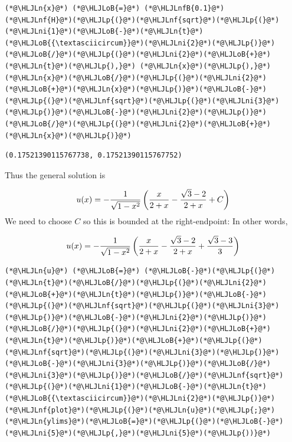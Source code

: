 \documentclass[12pt,a4paper]{article}
\newcommand{\HLJLn}[1]{#1}
\newcommand{\HLJLnf}[1]{\textcolor[RGB]{66,102,213}{#1}}
\newcommand{\HLJLnfB}[1]{\textcolor[RGB]{59,151,46}{#1}}
\newcommand{\HLJLni}[1]{\textcolor[RGB]{59,151,46}{#1}}
\newcommand{\HLJLoB}[1]{\textcolor[RGB]{102,102,102}{\textbf{#1}}}
\newcommand{\HLJLp}[1]{#1}
\begin{document}
\begin{lstlisting}
(*@\HLJLn{x}@*) (*@\HLJLoB{=}@*) (*@\HLJLnfB{0.1}@*)
(*@\HLJLnf{H}@*)(*@\HLJLp{(}@*)(*@\HLJLnf{sqrt}@*)(*@\HLJLp{(}@*)(*@\HLJLni{1}@*)(*@\HLJLoB{-}@*)(*@\HLJLn{t}@*)(*@\HLJLoB{{\textasciicircum}}@*)(*@\HLJLni{2}@*)(*@\HLJLp{)}@*)(*@\HLJLoB{/}@*)(*@\HLJLp{(}@*)(*@\HLJLni{2}@*)(*@\HLJLoB{+}@*)(*@\HLJLn{t}@*)(*@\HLJLp{),}@*) (*@\HLJLn{x}@*)(*@\HLJLp{),}@*) (*@\HLJLn{x}@*)(*@\HLJLoB{/}@*)(*@\HLJLp{(}@*)(*@\HLJLni{2}@*)(*@\HLJLoB{+}@*)(*@\HLJLn{x}@*)(*@\HLJLp{)}@*)(*@\HLJLoB{-}@*)(*@\HLJLp{(}@*)(*@\HLJLnf{sqrt}@*)(*@\HLJLp{(}@*)(*@\HLJLni{3}@*)(*@\HLJLp{)}@*)(*@\HLJLoB{-}@*)(*@\HLJLni{2}@*)(*@\HLJLp{)}@*)(*@\HLJLoB{/}@*)(*@\HLJLp{(}@*)(*@\HLJLni{2}@*)(*@\HLJLoB{+}@*)(*@\HLJLn{x}@*)(*@\HLJLp{)}@*)
\end{lstlisting}

\begin{lstlisting}
(0.17521390115767738, 0.17521390115767752)
\end{lstlisting}


Thus the general solution is

\[
u(x) = -{1 \over \sqrt{1-x^2}} \left( {x\over 2+x} -{ \sqrt{3} -2 \over 2+x} + C \right)
\]
We need to choose $C$ so this is bounded at the right-endpoint: In other words, 

\[
u(x) = -{1 \over \sqrt{1-x^2}} \left( {x\over 2+x} -{ \sqrt{3} -2 \over 2+x} +{ \sqrt{3} -3 \over 3}  \right)
\]

\begin{lstlisting}
(*@\HLJLn{u}@*) (*@\HLJLoB{=}@*) (*@\HLJLoB{-}@*)(*@\HLJLp{(}@*)(*@\HLJLn{t}@*)(*@\HLJLoB{/}@*)(*@\HLJLp{(}@*)(*@\HLJLni{2}@*)(*@\HLJLoB{+}@*)(*@\HLJLn{t}@*)(*@\HLJLp{)}@*)(*@\HLJLoB{-}@*)(*@\HLJLp{(}@*)(*@\HLJLnf{sqrt}@*)(*@\HLJLp{(}@*)(*@\HLJLni{3}@*)(*@\HLJLp{)}@*)(*@\HLJLoB{-}@*)(*@\HLJLni{2}@*)(*@\HLJLp{)}@*)(*@\HLJLoB{/}@*)(*@\HLJLp{(}@*)(*@\HLJLni{2}@*)(*@\HLJLoB{+}@*)(*@\HLJLn{t}@*)(*@\HLJLp{)}@*)(*@\HLJLoB{+}@*)(*@\HLJLp{(}@*)(*@\HLJLnf{sqrt}@*)(*@\HLJLp{(}@*)(*@\HLJLni{3}@*)(*@\HLJLp{)}@*)(*@\HLJLoB{-}@*)(*@\HLJLni{3}@*)(*@\HLJLp{)}@*)(*@\HLJLoB{/}@*)(*@\HLJLni{3}@*)(*@\HLJLp{)}@*)(*@\HLJLoB{/}@*)(*@\HLJLnf{sqrt}@*)(*@\HLJLp{(}@*)(*@\HLJLni{1}@*)(*@\HLJLoB{-}@*)(*@\HLJLn{t}@*)(*@\HLJLoB{{\textasciicircum}}@*)(*@\HLJLni{2}@*)(*@\HLJLp{)}@*)
(*@\HLJLnf{plot}@*)(*@\HLJLp{(}@*)(*@\HLJLn{u}@*)(*@\HLJLp{;}@*) (*@\HLJLn{ylims}@*)(*@\HLJLoB{=}@*)(*@\HLJLp{(}@*)(*@\HLJLoB{-}@*)(*@\HLJLni{5}@*)(*@\HLJLp{,}@*)(*@\HLJLni{5}@*)(*@\HLJLp{))}@*)
\end{lstlisting}
\end{document}
